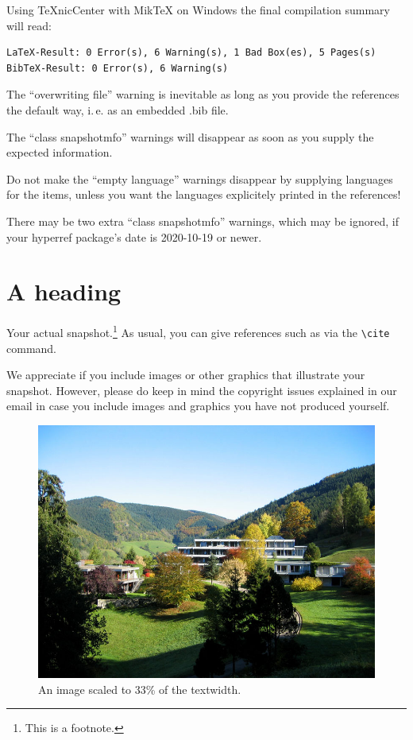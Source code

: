 \documentclass{snapshotmfo}
\begin{document}
Using TeXnicCenter with MikTeX on Windows the final compilation summary will read:
\begin{verbatim}
LaTeX-Result: 0 Error(s), 6 Warning(s), 1 Bad Box(es), 5 Pages(s)
BibTeX-Result: 0 Error(s), 6 Warning(s)
\end{verbatim}

The ``overwriting file'' warning is inevitable as long as you provide the references the default
way, i.\,e. as an embedded .bib file.

The ``class snapshotmfo'' warnings will disappear as soon as you supply the expected information.

Do not make the ``empty language'' warnings disappear by supplying languages for the items,
unless you want the languages explicitely printed in the references!

There may be two extra ``class snapshotmfo'' warnings, which may be ignored, if your hyperref 
package's date is 2020-10-19 or newer.

\section[Optional plain text substitute for PDF bookmark]{A heading}
Your actual snapshot.\footnote{This is a footnote.} As usual, you can give references such as \cite{knuth1984texbook, wikiMath, sample13, sample12, sample11, sample14} via the \verb+\cite+ command.

We appreciate if you include images or other graphics that illustrate your snapshot. However, please do keep in mind the copyright issues explained in our email in case you include images and graphics you have not produced yourself.

\begin{figure}[ht]
        \centering 
        \includegraphics[width= 0.33 \textwidth]{mfo.jpg}
        \caption{An image scaled to 33\% of the textwidth.}
\label{fig:sample-image}
\end{figure}
\end{document}
